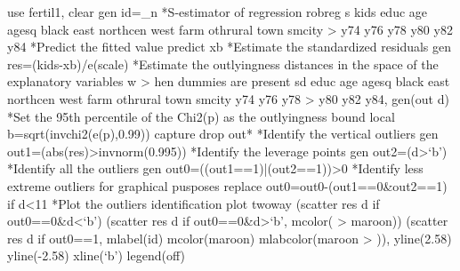 use fertil1, clear
gen id=_n
*S-estimator of regression
robreg s kids educ age agesq black east northcen west farm othrural town smcity 
> y74 y76 y78 y80 y82 y84
{\smallskip}
*Predict the fitted value
predict xb
{\smallskip}
*Estimate the standardized residuals
gen res=(kids-xb)/e(scale)
{\smallskip}
*Estimate the outlyingness distances in the space of the explanatory variables w
> hen dummies are present
sd educ age agesq black east northcen west farm othrural town smcity y74 y76 y78
>  y80 y82 y84, gen(out d)
{\smallskip}
*Set the 95th percentile of the Chi2(p) as the outlyingness bound
local b=sqrt(invchi2(e(p),0.99))
capture drop out*
{\smallskip}
*Identify the vertical outliers
gen out1=(abs(res)>invnorm(0.995))
{\smallskip}
{\smallskip}
*Identify the leverage points
gen out2=(d>`b')
{\smallskip}
*Identify all the outliers
gen out0=((out1==1)|(out2==1))>0
{\smallskip}
*Identify less extreme outliers for graphical pusposes
replace out0=out0-(out1==0\&out2==1) if d<11
{\smallskip}
*Plot the outliers identification plot
twoway (scatter res d if out0==0\&d<`b') (scatter res d if out0==0\&d>`b', mcolor(
> maroon)) (scatter res d if out0==1, mlabel(id) mcolor(maroon) mlabcolor(maroon
> )), yline(2.58) yline(-2.58) xline(`b') legend(off)
